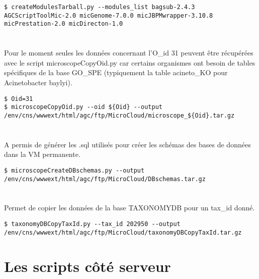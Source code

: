 \begin{lstlisting}[style=bash]
$ createModulesTarball.py --modules_list bagsub-2.4.3 AGCScriptToolMic-2.0 micGenome-7.0.0 micJBPMwrapper-3.10.8 micPrestation-2.0 micDirecton-1.0
\end{lstlisting}

\section{}

\begin{mycolorbox}
	Pour le moment seules les données concernant l'O\_id 31 peuvent être récupérées avec le script microscopeCopyOid.py car certains organismes ont besoin de tables spécifiques de la base GO\_SPE (typiquement la table acineto\_KO pour Acinetobacter baylyi).
\end{mycolorbox}

\begin{lstlisting}[style=bash]
$ Oid=31
$ microscopeCopyOid.py --oid ${Oid} --output /env/cns/wwwext/html/agc/ftp/MicroCloud/microscope_${Oid}.tar.gz
\end{lstlisting}

\section{}
A permis de générer les .sql utilisés pour créer les schémas des bases de données dans la VM permanente.

\begin{lstlisting}[style=bash]
$ microscopeCreateDBschemas.py --output /env/cns/wwwext/html/agc/ftp/MicroCloud/DBschemas.tar.gz
\end{lstlisting}

\section{}
Permet de copier les données de la base TAXONOMYDB pour un tax\_id donné.

\begin{lstlisting}[style=bash]
$ taxonomyDBCopyTaxId.py --tax_id 202950 --output /env/cns/wwwext/html/agc/ftp/MicroCloud/taxonomyDBCopyTaxId.tar.gz
\end{lstlisting}

\section{Les scripts côté serveur}

